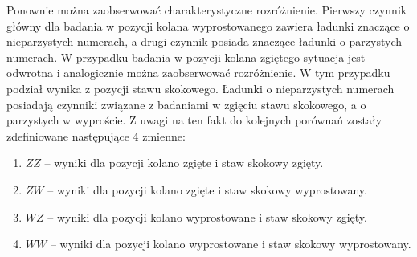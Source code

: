 Ponownie można zaobserwować charakterystyczne rozróżnienie. Pierwszy czynnik główny dla badania w pozycji kolana wyprostowanego zawiera ładunki znaczące o nieparzystych numerach, a drugi czynnik posiada znaczące ładunki o parzystych numerach. W przypadku badania w pozycji kolana zgiętego sytuacja jest odwrotna i analogicznie można zaobserwować rozróżnienie. W tym przypadku podział wynika z pozycji stawu skokowego. Ładunki o nieparzystych numerach posiadają czynniki związane z badaniami w zgięciu stawu skokowego, a o parzystych w wyproście. \linebreak Z uwagi na ten fakt do kolejnych porównań zostały zdefiniowane następujące 4 zmienne:
\begin{enumerate}
	\item $ZZ$ -- wyniki dla pozycji kolano zgięte i staw skokowy zgięty.
	\item $ZW$ -- wyniki dla pozycji kolano zgięte i staw skokowy wyprostowany.
	\item $WZ$ -- wyniki dla pozycji kolano wyprostowane i staw skokowy zgięty.
	\item $WW$ -- wyniki dla pozycji kolano wyprostowane i staw skokowy wyprostowany.
\end{enumerate} 
